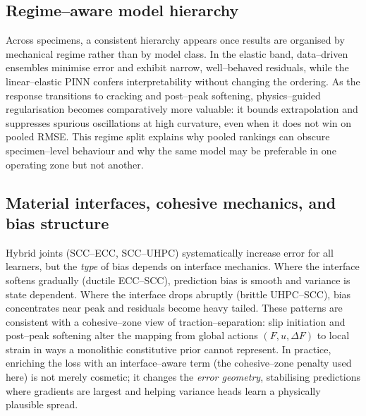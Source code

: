 \documentclass{article}
\begin{document}
\subsection{Regime–aware model hierarchy}
Across specimens, a consistent hierarchy appears once results are organised by mechanical regime rather than by model class. In the elastic band, data–driven ensembles minimise error and exhibit narrow, well–behaved residuals, while the linear–elastic PINN confers interpretability without changing the ordering. As the response transitions to cracking and post–peak softening, physics–guided regularisation becomes comparatively more valuable: it bounds extrapolation and suppresses spurious oscillations at high curvature, even when it does not win on pooled RMSE. This regime split explains why pooled rankings can obscure specimen–level behaviour and why the same model may be preferable in one operating zone but not another.

\subsection{Material interfaces, cohesive mechanics, and bias structure}
Hybrid joints (SCC–ECC, SCC–UHPC) systematically increase error for all learners, but the \emph{type} of bias depends on interface mechanics. Where the interface softens gradually (ductile ECC–SCC), prediction bias is smooth and variance is state dependent. Where the interface drops abruptly (brittle UHPC–SCC), bias concentrates near peak and residuals become heavy tailed. These patterns are consistent with a cohesive–zone view of traction–separation: slip initiation and post–peak softening alter the mapping from global actions $(F,u,\Delta F)$ to local strain in ways a monolithic constitutive prior cannot represent. In practice, enriching the loss with an interface–aware term (the cohesive–zone penalty used here) is not merely cosmetic; it changes the \emph{error geometry}, stabilising predictions where gradients are largest and helping variance heads learn a physically plausible spread.
\end{document}
